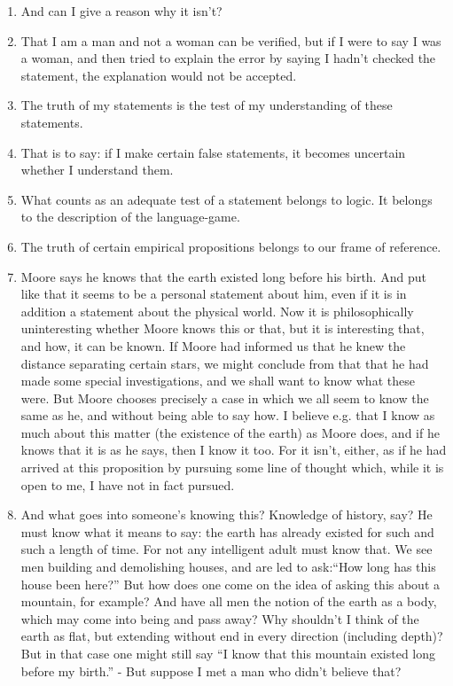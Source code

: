 \documentclass{book}
\begin{document}
\begin{enumerate}
\item
And can I give a reason why it isn't?

\item
That I am a man and not a woman can be verified, but if I were to say I was a
woman, and then tried to explain the error by saying I hadn't checked the
statement, the explanation would not be accepted.

\item
The truth of my statements is the test of my understanding of these statements.

\item
That is to say: if I make certain false statements, it becomes uncertain
whether I understand them.

\item
What counts as an adequate test of a statement belongs to logic. It belongs to
the description of the language-game.

\item
The truth of certain empirical propositions belongs to our frame of reference.

\item
Moore says he knows that the earth existed long before his birth. And put like
that it seems to be a personal statement about him, even if it is in addition a
statement about the physical world. Now it is philosophically uninteresting
whether Moore knows this or that, but it is interesting that, and how, it can
be known. If Moore had informed us that he knew the distance separating certain
stars, we might conclude from that that he had made some special
investigations, and we shall want to know what these were. But Moore chooses
precisely a case in which we all seem to know the same as he, and without being
able to say how. I believe e.g. that I know as much about this matter (the
existence of the earth) as Moore does, and if he knows that it is as he says,
then I know it too. For it isn't, either, as if he had arrived at this
proposition by pursuing some line of thought which, while it is open to me, I
have not in fact pursued.

\item
And what goes into someone's knowing this? Knowledge of history, say? He must
know what it means to say: the earth has already existed for such and such a
length of time. For not any intelligent adult must know that. We see men
building and demolishing houses, and are led to ask:``How long has this house
been here?'' But how does one come on the idea of asking this about a mountain,
for example? And have all men the notion of the earth as a body, which may come
into being and pass away? Why shouldn't I think of the earth as flat, but
extending without end in every direction (including depth)? But in that case
one might still say ``I know that this mountain existed long before my birth.''
- But suppose I met a man who didn't believe that?


\end{enumerate}
\end{document}
